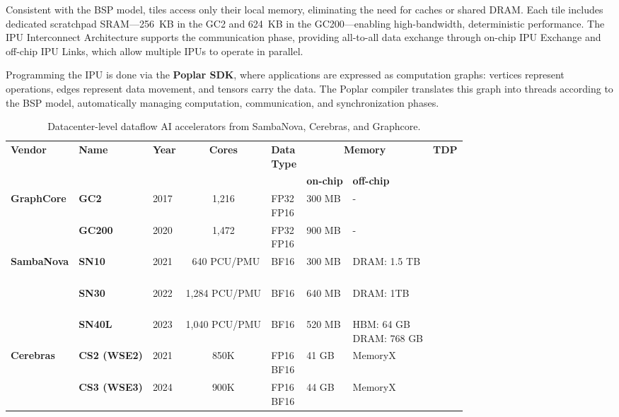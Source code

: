 Consistent with the BSP model, tiles access only their local memory, eliminating the need for caches or shared DRAM. Each tile includes dedicated scratchpad SRAM—256~KB in the GC2 and 624~KB in the GC200—enabling high-bandwidth, deterministic performance. The IPU Interconnect Architecture supports the communication phase, providing all-to-all data exchange through on-chip IPU Exchange and off-chip IPU Links, which allow multiple IPUs to operate in parallel.

Programming the IPU is done via the \textbf{Poplar SDK}, where applications are expressed as computation graphs: vertices represent operations, edges represent data movement, and tensors carry the data. The Poplar compiler translates this graph into threads according to the BSP model, automatically managing computation, communication, and synchronization phases.

\begin{table}[h!]
\centering
\footnotesize
\caption{Datacenter-level dataflow AI accelerators from SambaNova, Cerebras, and Graphcore.}
\scriptsize
\begin{tabularx}{\textwidth}{|l|l|l|c|l|l|l|l|}
\cline{1-8}
\textbf{Vendor} & \textbf{Name} & \textbf{Year} & \textbf{Cores} & \makecell[l]{\textbf{Data} \\ \textbf{Type}} & \multicolumn{2}{c|}{\textbf{Memory}} & \textbf{TDP} \\
\cline{6-7}
 & & & & & \textbf{on-chip} & \textbf{off-chip} & \\
 \cline{1-8}
 \multirow{2}{*}{\textbf{GraphCore}} 
 & \textbf{GC2}          & 2017 & 1,216  & \makecell[l]{FP32\\FP16} & 300 MB & - &  \\
\cline{2-8}
 & \textbf{GC200}        & 2020 & 1,472  & \makecell[l]{FP32\\FP16} & 900 MB & - &  \\
\cline{1-8}
\multirow{3}{*}{\textbf{SambaNova}}
 & \textbf{SN10}      & 2021 & \ 640 PCU/PMU & \makecell[l]{BF16\\\ } &   300 MB   & DRAM: 1.5 TB &  \\
\cline{2-8}
 & \textbf{SN30}      & 2022 & 1,284 PCU/PMU & \makecell[l]{BF16\\\ } & 640 MB   & DRAM: 1TB &  \\
\cline{2-8}
 & \textbf{SN40L}    & 2023 &  1,040 PCU/PMU & BF16 & 520 MB   & \makecell[l]{HBM: 64 GB\\DRAM: 768 GB} &  \\
\cline{1-8}
\multirow{2}{*}{\textbf{Cerebras}}
 & \textbf{CS2 (WSE2)}   & 2021 & 850K  & \makecell[l]{FP16\\BF16} & 41 GB& MemoryX &  \\
\cline{2-8}
 & \textbf{CS3 (WSE3)}   & 2024 & 900K  & \makecell[l]{FP16\\BF16} & 44 GB & MemoryX &  \\
\cline{1-8}
\end{tabularx}
\label{tab:dflow}
\end{table}

\newpage